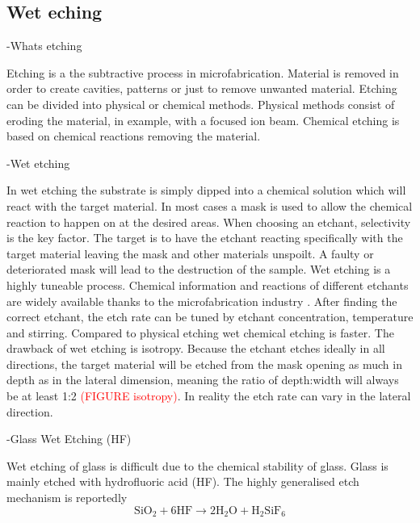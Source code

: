 \documentclass[draft]{jyflluk}
\begin{document}
\subsection{Wet eching}
\label{sec:xx4}
-Whats etching

Etching is a the subtractive process in microfabrication. Material is removed in order to create cavities, patterns or just to remove unwanted material. Etching can be divided into physical or chemical methods. Physical methods consist of eroding the material, in example, with a focused ion beam. Chemical etching is based on chemical reactions removing the material. 

-Wet etching 

In wet etching the substrate is simply dipped into a chemical solution which will react with the target material. In most cases a mask is used to allow the chemical reaction to happen on at the desired areas. When choosing an etchant, selectivity is the key factor. The target is to have the etchant reacting specifically with the target material leaving the mask and other materials unspoilt. A faulty or deteriorated mask will lead to the destruction of the sample. 
Wet etching is a highly tuneable process. Chemical information and reactions of different etchants are widely available thanks to the microfabrication industry \cite{williams2003etch}. After finding the correct etchant, the etch rate can be tuned by etchant concentration, temperature and stirring. Compared to physical etching wet chemical etching is faster. The drawback of wet etching is isotropy. Because the etchant etches ideally in all directions, the target material will be etched from the mask opening as much in depth as in the lateral dimension, meaning the ratio of depth:width will always be at least 1:2 \textcolor{red}{(FIGURE isotropy)}. In reality the etch rate can vary in the lateral direction. \cite{lee2010microfabrication}


-Glass Wet Etching (HF)

Wet etching of glass is difficult due to the chemical stability of glass. Glass is mainly etched with hydrofluoric acid (HF). The highly generalised etch mechanism is reportedly \cite{etch_formula}
\begin{equation}
    \label{eq:HF_etch}
    \mathrm{SiO_2} + \mathrm{6HF} \rightarrow  \mathrm{2H_2 O} + \mathrm{H_2 Si F_6}
\end{equation}
\end{document}

